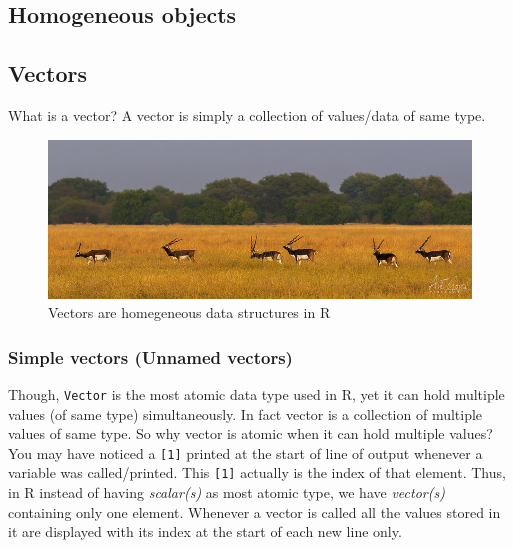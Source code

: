 \documentclass[
]{book}
\begin{document}
\hypertarget{homogeneous-objects}{%
\subsection*{Homogeneous objects}\label{homogeneous-objects}}

\hypertarget{vectors}{%
\subsection{Vectors}\label{vectors}}

What is a vector? A vector is simply a collection of values/data of same type.

\begin{figure}

{\centering \includegraphics[width=0.99\linewidth]{images/vec_buck} 

}

\caption{Vectors are homegeneous data structures in R}\label{fig:vecs}
\end{figure}

\hypertarget{simple-vectors-unnamed-vectors}{%
\subsubsection{Simple vectors (Unnamed vectors)}\label{simple-vectors-unnamed-vectors}}

Though, \texttt{Vector} is the most atomic data type used in R, yet it can hold multiple values (of same type) simultaneously. In fact vector is a collection of multiple values of same type. So why vector is atomic when it can hold multiple values? You may have noticed a \texttt{{[}1{]}} printed at the start of line of output whenever a variable was called/printed. This \texttt{{[}1{]}} actually is the index of that element. Thus, in R instead of having \emph{scalar(s)} as most atomic type, we have \emph{vector(s)} containing only one element. Whenever a vector is called all the values stored in it are displayed with its index at the start of each new line only.
\end{document}
